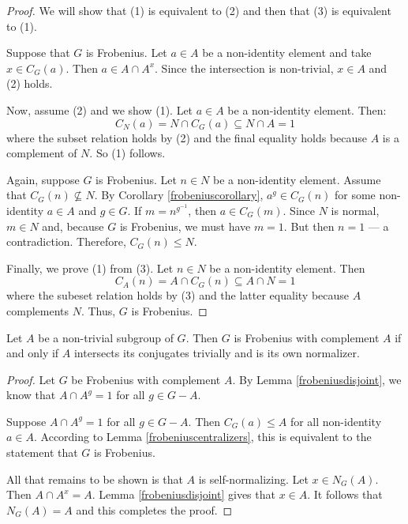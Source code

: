 \documentclass[main.tex]{subfiles}
\begin{document}
\begin{proof}
We will show that (1) is equivalent to (2) and then that (3) is equivalent to (1).

Suppose that $G$ is Frobenius. Let $a \in A$ be a non-identity element and take $x \in C_G(a)$. Then $a \in A \cap A^x$. Since the intersection is non-trivial, $x \in A$ and (2) holds.

Now, assume (2) and we show (1). Let $a \in A$ be a non-identity element. Then:
$$C_N(a) = N \cap C_G(a) \subseteq N \cap A = 1$$
where the subset relation holds by (2) and the final equality holds because $A$ is a complement of $N$. So (1) follows.

Again, suppose $G$ is Frobenius. Let $n \in N$ be a non-identity element. Assume that $C_G(n) \not\subseteq N$. By Corollary \ref{frobeniuscorollary}, $a^g \in C_G(n)$ for some non-identity $a \in A$ and $g \in G$. If $m = n^{g^{-1}}$, then $a \in C_G(m)$. Since $N$ is normal, $m \in N$ and, because $G$ is Frobenius, we must have $m=1$. But then $n = 1$ --- a contradiction. Therefore, $C_G(n) \le N$.

Finally, we prove (1) from (3). Let $n \in N$ be a non-identity element. Then
$$C_A(n) = A \cap C_G(n) \subseteq A \cap N = 1$$
where the subeset relation holds by (3) and the latter equality because $A$ complements $N$. Thus, $G$ is Frobenius.
\end{proof}

\begin{lemma}\label{frobeniusnormalizer}
Let $A$ be a non-trivial subgroup of $G$. Then $G$ is Frobenius with complement $A$ if and only if $A$ intersects its conjugates trivially and is its own normalizer.
\end{lemma}

\begin{proof}
Let $G$ be Frobenius with complement $A$. By Lemma \ref{frobeniusdisjoint}, we know that $A \cap A^g = 1$ for all $g \in G - A$.

Suppose $A \cap A^g = 1$ for all $g \in G - A$. Then $C_G(a) \le A$ for all non-identity $a \in A$.  According to Lemma \ref{frobeniuscentralizers}, this is equivalent to the statement that $G$ is Frobenius.

All that remains to be shown is that $A$ is self-normalizing. Let $x \in N_G(A)$. Then $A \cap A^x = A$. Lemma \ref{frobeniusdisjoint} gives that $x \in A$. It follows that $N_G(A) = A$ and this completes the proof.
\end{proof}
\end{document}
